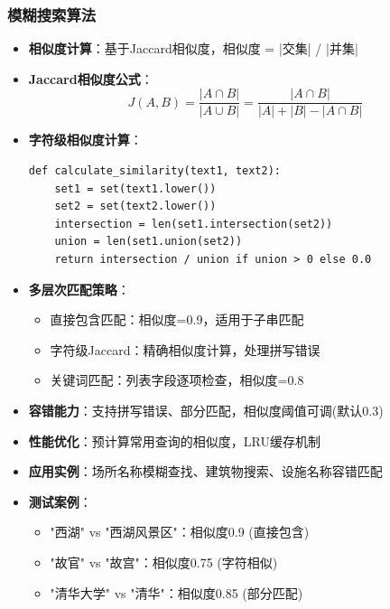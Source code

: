 \documentclass[12pt,a4paper]{article}
\begin{document}
\subsubsection{模糊搜索算法}
\begin{itemize}
    \item \textbf{相似度计算}：基于Jaccard相似度，相似度 = |交集| / |并集|
    \item \textbf{Jaccard相似度公式}：
    \[J(A,B) = \frac{|A \cap B|}{|A \cup B|} = \frac{|A \cap B|}{|A| + |B| - |A \cap B|}\]
    \item \textbf{字符级相似度计算}：
    \begin{verbatim}
def calculate_similarity(text1, text2):
    set1 = set(text1.lower())
    set2 = set(text2.lower())
    intersection = len(set1.intersection(set2))
    union = len(set1.union(set2))
    return intersection / union if union > 0 else 0.0
    \end{verbatim}
    \item \textbf{多层次匹配策略}：
    \begin{itemize}
        \item 直接包含匹配：相似度=0.9，适用于子串匹配
        \item 字符级Jaccard：精确相似度计算，处理拼写错误
        \item 关键词匹配：列表字段逐项检查，相似度=0.8
    \end{itemize}
    \item \textbf{容错能力}：支持拼写错误、部分匹配，相似度阈值可调(默认0.3)
    \item \textbf{性能优化}：预计算常用查询的相似度，LRU缓存机制
    \item \textbf{应用实例}：场所名称模糊查找、建筑物搜索、设施名称容错匹配
    \item \textbf{测试案例}：
    \begin{itemize}
        \item "西湖" vs "西湖风景区"：相似度0.9 (直接包含)
        \item "故官" vs "故宫"：相似度0.75 (字符相似)
        \item "清华大学" vs "清华"：相似度0.85 (部分匹配)
    \end{itemize}
\end{itemize}
\end{document}
